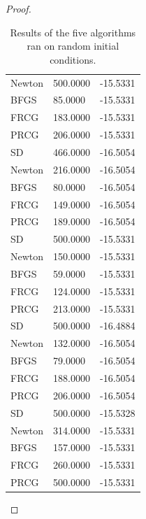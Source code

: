 \documentclass[12pt]{report}
\begin{document}
\begin{problem}
\begin{proof}
\begin{table}[h!]
\begin{tabular}{l l l}
        Newton & 500.0000 & -15.5331 \\
        BFGS & 85.0000 & -15.5331 \\
        FRCG & 183.0000 & -15.5331 \\
        PRCG & 206.0000 & -15.5331 \\
        \hline
        SD & 466.0000 & -16.5054 \\
        Newton & 216.0000 & -16.5054 \\
        BFGS & 80.0000 & -16.5054 \\
        FRCG & 149.0000 & -16.5054 \\
        PRCG & 189.0000 & -16.5054 \\
        \hline
        SD & 500.0000 & -15.5331 \\
        Newton & 150.0000 & -15.5331 \\
        BFGS & 59.0000 & -15.5331 \\
        FRCG & 124.0000 & -15.5331 \\
        PRCG & 213.0000 & -15.5331 \\
        \hline
        SD & 500.0000 & -16.4884 \\
        Newton & 132.0000 & -16.5054 \\
        BFGS & 79.0000 & -16.5054 \\
        FRCG & 188.0000 & -16.5054 \\
        PRCG & 206.0000 & -16.5054 \\
        \hline
        SD & 500.0000 & -15.5328 \\
        Newton & 314.0000 & -15.5331 \\
        BFGS & 157.0000 & -15.5331 \\
        FRCG & 260.0000 & -15.5331 \\
        PRCG & 500.0000 & -15.5331 \\
        \hline
        \end{tabular}
        \caption{Results of the five algorithms ran on random initial conditions.}
        \label{table:lots of data}
        \end{table}
        

\end{proof}
\end{problem}
\end{document}
